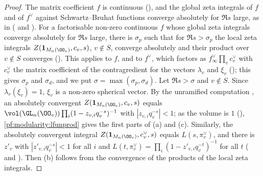 \begin{proof}
The matrix coefficient $f$ is continuous
(), and the global zeta integrals of $f$ and of
$f^\vee$ against Schwartz--Bruhat functions converge absolutely for $\Re s$ large, as in \cite{GodementJacquet1972}
( and ).
For a factorisable non-zero continuous $f$ whose global zeta integrals converge absolutely for $\Re s$ large, there is
$\sigma_p$ such that for $\Re s>\sigma_p$ the local zeta integrals $Z(\mathbf 1_{M_n(\OO_v)},c_v,s)$, $v\notin S$, converge
absolutely and their product over $v\notin S$ converges
(). This applies to $f$, and to $f^\vee$, which
factors as $f^\vee_\infty\prod_vc_v^\vee$ with $c_v^\vee$ the matrix coefficient of the contragredient for the vectors
$\lambda_v$ and $\xi_v$ (); this gives $\sigma_p$ and
$\sigma_d$, and we put $\sigma=\max(\sigma_p,\sigma_d)$. Let $\Re s>\sigma$ and $v\notin S$. Since $\lambda_v(\xi_v)=1$,
$\xi_v$ is a non-zero spherical vector. By the unramified computation \cite{GodementJacquet1972}, an absolutely convergent
$Z(\mathbf 1_{M_n(\OO_v)},c_v,s)$ equals $\vol(\GL_n(\OO_v))\prod_i(1-z_{v,i}q_v^{-s})^{-1}$ with $|z_{v,i}q_v^{-s}|<1$; as
the volume is $1$ (), \cref{pf:modularity:lfunprod}
gives the first parts of (a) and (c). Similarly, the absolutely convergent integral $Z(\mathbf 1_{M_n(\OO_v)},c_v^\vee,s)$
equals $L(s,\pi_v^\vee)$, and there is $z'_v$ with $|z'_{v,i}q_v^{-s}|<1$ for all $i$ and
$L(t,\pi_v^\vee)=\prod_i(1-z'_{v,i}q_v^{-t})^{-1}$ for all $t$
( and ).
Then (b) follows from the convergence of the products of the local zeta integrals.
\end{proof}

